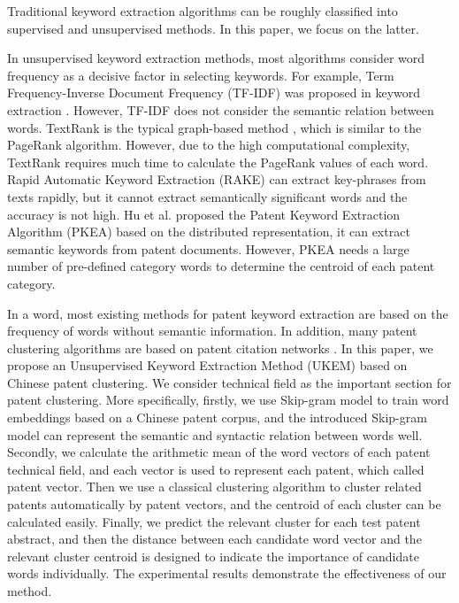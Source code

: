 \documentclass[conference]{IEEEtran}
\begin{document}
\begin{CJK}{UTF8}{gbsn}
	Traditional keyword extraction algorithms can be roughly classified into supervised and unsupervised methods. In this paper, we focus on the latter.
	
	In unsupervised keyword extraction methods, most algorithms consider word frequency as a decisive factor in selecting keywords. For example, Term Frequency-Inverse Document Frequency (TF-IDF) was proposed in keyword extraction \cite{b5}. However, TF-IDF does not consider the semantic relation between words. TextRank is the typical graph-based method \cite{b6}, which is similar to the PageRank algorithm. However, due to the high computational complexity, TextRank requires much time to calculate the PageRank values of each word. Rapid Automatic Keyword Extraction (RAKE) \cite{b7} can extract key-phrases from texts rapidly, but it cannot extract semantically significant words and the accuracy is not high. Hu et al. \cite{b8} proposed the Patent Keyword Extraction Algorithm (PKEA) based on the distributed representation, it can extract semantic keywords from patent documents. However, PKEA needs a large number of pre-defined category words to determine the centroid of each patent category.
	
	In a word, most existing methods for patent keyword extraction are based on the frequency of words without semantic information. In addition, many patent clustering algorithms are based on patent citation networks \cite{b9}. In this paper, we propose an Unsupervised Keyword Extraction Method (UKEM) based on Chinese patent clustering. We consider technical field as the important section for patent clustering. More specifically, firstly, we use Skip-gram model \cite{b10} to train word embeddings based on a Chinese patent corpus, and the introduced Skip-gram model can represent the semantic and syntactic relation between words well. Secondly, we calculate the arithmetic mean of the word vectors of each patent technical field, and each vector is used to represent each patent, which called patent vector. Then we use a classical clustering algorithm to cluster related patents automatically by patent vectors, and the centroid of each cluster can be calculated easily. Finally, we predict the relevant cluster for each test patent abstract, and then the distance between each candidate word vector and the relevant cluster centroid is designed to indicate the importance of candidate words individually. The experimental results demonstrate the effectiveness of our method.
	

\end{CJK}
\end{document}
